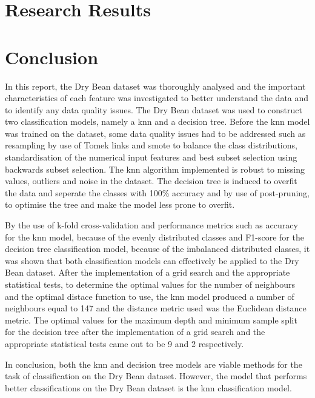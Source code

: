 \documentclass[10pt, conference]{IEEEtran}
\begin{document}
\section{Research Results} \label{section:Research Results}


\section{Conclusion} \label{section:Conclusion}

In this report, the Dry Bean dataset was thoroughly analysed and the important characteristics of each feature was investigated
to better understand the data and to identify any data quality issues. The Dry Bean dataset was used to construct two classification
models, namely a \acrfull{knn} and a decision tree. Before the \acrshort{knn} model was trained on the dataset, some data
quality issues had to be addressed such as resampling by use of Tomek links and \acrfull{smote} to balance the class distributions,
standardisation of the numerical input features and best subset selection using backwards subset selection. The \acrshort{knn}
algorithm implemented is robust to missing values, outliers and noise in the dataset. The decision tree is induced to overfit the data
and seperate the classes with 100\% accuracy and by use of post-pruning, to optimise the tree and make the model less prone to overfit.

By the use of k-fold cross-validation and performance metrics such as accuracy for the \acrshort{knn} model, because of the evenly
distributed classes and F1-score for the decision tree classification model, because of the imbalanced distributed classes,
it was shown that both classification models can effectively be applied to the Dry Bean dataset. After the implementation
of a grid search and the appropriate statistical tests, to determine the optimal values for the number of neighbours and the optimal
distace function to use, the \acrshort{knn} model produced a number of neighbours equal to 147 and the distance metric used was
the Euclidean distance metric. The optimal values for the maximum depth and minimum sample split for the decision tree after
the implementation of a grid search and the appropriate statistical tests came out to be 9 and 2 respectively.

In conclusion, both the \acrshort{knn} and decision tree models are viable methods for the task of classification on the Dry Bean dataset.
However, the model that performs better classifications on the Dry Bean dataset is the \acrshort{knn} classification model.
\end{document}
